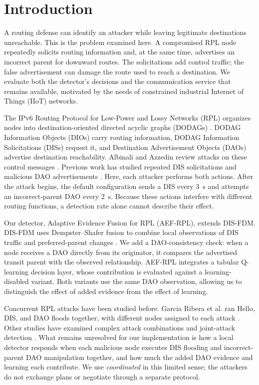 \section{Introduction}\label{sec:introduction}
A routing defense can identify an attacker while leaving legitimate destinations unreachable. This is the problem examined here. A compromised RPL node repeatedly solicits routing information and, at the same time, advertises an incorrect parent for downward routes. The solicitations add control traffic; the false advertisement can damage the route used to reach a destination. We evaluate both the detector's decisions and the communication service that remains available, motivated by the needs of constrained industrial Internet of Things (IIoT) networks.

The IPv6 Routing Protocol for Low-Power and Lossy Networks (RPL) organizes nodes into destination-oriented directed acyclic graphs (DODAGs) \cite{rfc6550}. DODAG Information Objects (DIOs) carry routing information, DODAG Information Solicitations (DISs) request it, and Destination Advertisement Objects (DAOs) advertise destination reachability. Albinali and Azzedin review attacks on these control messages \cite{albinali2024}. Previous work has studied repeated DIS solicitations \cite{rajasekar2022,vermaranga2020,medjek2021} and malicious DAO advertisements \cite{pu2018,limsd2024}. Here, each attacker performs both actions. After the attack begins, the default configuration sends a DIS every 3~s and attempts an incorrect-parent DAO every 2~s. Because these actions interfere with different routing functions, a detection rate alone cannot describe their effect.

Our detector, Adaptive Evidence Fusion for RPL (AEF-RPL), extends DIS-FDM. DIS-FDM uses Dempster--Shafer fusion to combine local observations of DIS traffic and preferred-parent changes \cite{prajisha2025}. We add a DAO-consistency check: when a node receives a DAO directly from its originator, it compares the advertised transit parent with the observed relationship. AEF-RPL integrates a tabular Q-learning decision layer, whose contribution is evaluated against a learning-disabled variant. Both variants use the same DAO observation, allowing us to distinguish the effect of added evidence from the effect of learning.

Concurrent RPL attacks have been studied before. Garcia Ribera et al. ran Hello, DIS, and DAO floods together, with different nodes assigned to each attack \cite{garciaribera2022}. Other studies have examined complex attack combinations and joint-attack detection \cite{alsukayti2023,de2rarpl2024,abdulkareem2024}. What remains unresolved for our implementation is how a local detector responds when each malicious node executes DIS flooding and incorrect-parent DAO manipulation together, and how much the added DAO evidence and learning each contribute. We use \emph{coordinated} in this limited sense; the attackers do not exchange plans or negotiate through a separate protocol.

